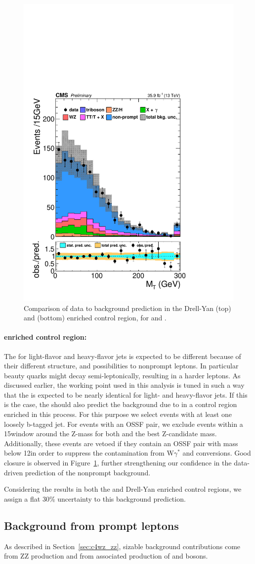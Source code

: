 \begin{figure}[h!]
\includegraphics[width=.30\textwidth]{Figures/c5/TTCR/convVeto/mt_minMos_TT.pdf}
\caption{Comparison of data to background prediction in the Drell-Yan
  (top) and \ttbar (bottom) enriched control region,
  for \mmin and \mtmin. \willem} 
\label{fig:npvalidation}
\end{figure}

\paragraph{\texorpdfstring{\ttbar}{ttbar} enriched control region:}
The \fr for light-flavor and heavy-flavor jets is expected to be
different because of their different structure, and possibilities to
nonprompt leptons. In particular beauty quarks might decay
semi-leptonically, resulting in a harder leptons. As discussed earlier, the \fo working point used in this analysis is tuned in such a way that the \fr is expected to be nearly identical for light- and heavy-flavor jets. If this is the case, the \fr should also predict the background due to \ttbar  in a control region enriched in this process.
For this purpose we select events with at least one loosely b-tagged jet. 
For events with an OSSF pair, we exclude events within a 15\GeV window
around the Z-mass for both \mlll  and the best Z-candidate
mass. Additionally, these events are vetoed if they contain an OSSF
pair with mass below 12\GeV in order to suppress the contamination
from W$\gamma^{*}$ and conversions. Good closure is observed in Figure~\ref{fig:npvalidation}, further strengthening our confidence in the data-driven prediction of the nonprompt background.



Considering the results in both the \ttbar and Drell-Yan enriched control regions, we assign a flat 30\% uncertainty to this background prediction. 

\subsection{Background from prompt leptons}
As described in Section~\ref{sec:c4wz_zz}, sizable background
contributions come from ZZ production and from associated production of
\PW and \PZ bosons.

